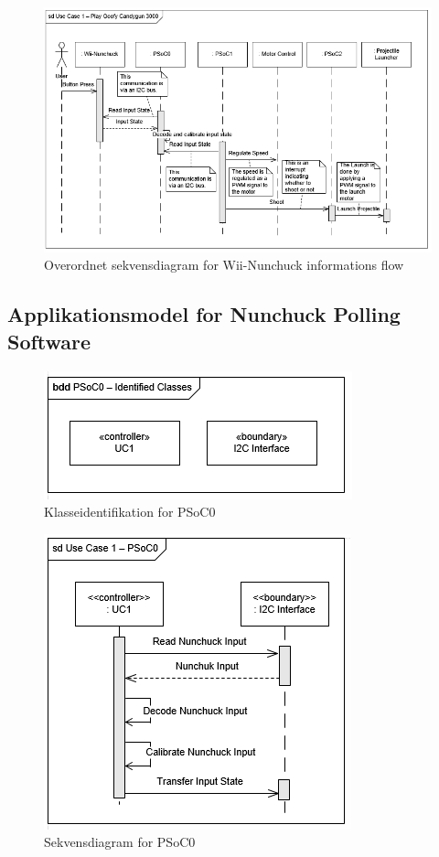\begin{figure}[H]
	\centering
	\includegraphics[width=\textwidth]{Systemarkitektur/images/WiiNunchuckSequenceDiagram.png}
	\caption{Overordnet sekvensdiagram for Wii-Nunchuck informations flow}
	\label{fig:WiiNunchuckSequenceDiagram}
\end{figure}

\subsection{Applikationsmodel for Nunchuck Polling Software}

\begin{figure}[H]
	\centering
	\includegraphics[scale=0.8]{Systemarkitektur/images/klasseIdentificationUC1PSoC0}
	\caption{Klasseidentifikation for PSoC0}
	\label{fig:klasseidentifikationUC1PSoC0}
\end{figure}

\begin{figure}[H]
	\centering
	\includegraphics[scale=0.8]{Systemarkitektur/images/UC1PSoC0SequenceDiagram}
	\caption{Sekvensdiagram for PSoC0}
	\label{fig:sekvensUC1PSoC0}
\end{figure}

